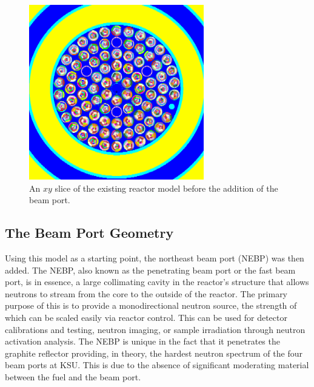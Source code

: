 \begin{figure}[htb]
\centering
\includegraphics[height=3in]{tex/figures/existingxy.png}
\caption[Old Reactor Model $XY$]{An $xy$ slice of the existing reactor model before the addition of the beam port.}
\label{fig:existingxy}
\end{figure}


\subsection{The Beam Port Geometry}

Using this model as a starting point, the northeast beam port (NEBP) was then added.
The NEBP, also known as the penetrating beam port or the fast beam port, is in essence, a large collimating cavity in the reactor's structure that allows neutrons to stream from the core to the outside of the reactor.
The primary purpose of this is to provide a monodirectional neutron source, the strength of which can be scaled easily via reactor control.
This can be used for detector calibrations and testing, neutron imaging, or sample irradiation through neutron activation analysis.
The NEBP is unique in the fact that it penetrates the graphite reflector providing, in theory, the hardest neutron spectrum of the four beam ports at KSU.
This is due to the absence of significant moderating material between the fuel and the beam port.

